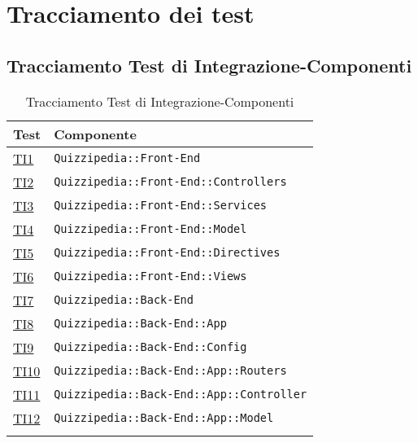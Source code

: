 \section{Tracciamento dei test}
\subsection{Tracciamento Test di Integrazione-Componenti}
\normalsize
\begin{longtable}[ht]{|>{\centering}m{3cm}|m{9cm}<{\centering}|}
\hline 
\textbf{Test} & \textbf{Componente}\\
\hline
\endhead
\hyperlink{TI1}{TI1} & {\texttt{Quizzipedia::Front-End}}\\ \hline
\hyperlink{TI2}{TI2} & {\texttt{Quizzipedia::Front-End::Controllers}}\\ \hline
\hyperlink{TI3}{TI3} & {\texttt{Quizzipedia::Front-End::Services}}\\ \hline
\hyperlink{TI4}{TI4} & {\texttt{Quizzipedia::Front-End::Model}}\\ \hline
\hyperlink{TI5}{TI5} & {\texttt{Quizzipedia::Front-End::Directives}}\\ \hline
\hyperlink{TI6}{TI6} & {\texttt{Quizzipedia::Front-End::Views}}\\ \hline
\hyperlink{TI7}{TI7} & {\texttt{Quizzipedia::Back-End}}\\ \hline
\hyperlink{TI8}{TI8} & {\texttt{Quizzipedia::Back-End::App}}\\ \hline
\hyperlink{TI9}{TI9} & {\texttt{Quizzipedia::Back-End::Config}}\\ \hline
\hyperlink{TI10}{TI10} & {\texttt{Quizzipedia::Back-End::App::Routers}}\\ \hline
\hyperlink{TI11}{TI11} & {\texttt{Quizzipedia::Back-End::App::Controller}}\\ \hline
\hyperlink{TI12}{TI12} & {\texttt{Quizzipedia::Back-End::App::Model}}\\ \hline
\caption[Tracciamento Test di Integrazione-Componenti]{Tracciamento Test di Integrazione-Componenti}
\label{tabella:ts-requi}
\end{longtable}
\FloatBarrier

